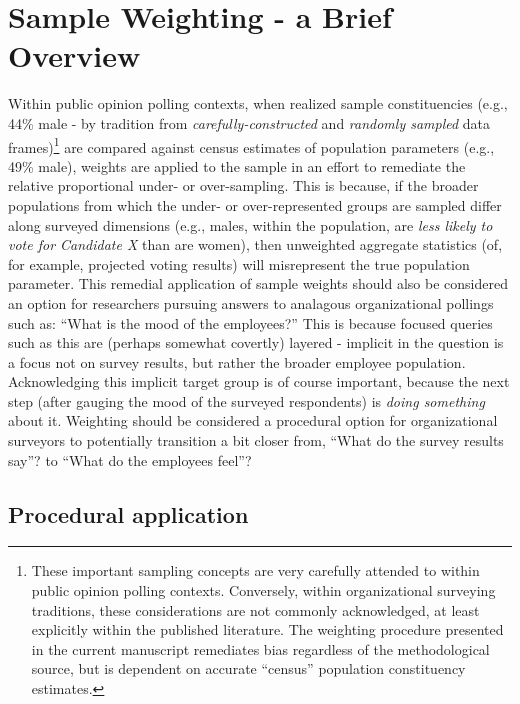 \documentclass[
  man,mask]{apa7}
\begin{document}
\hypertarget{sample-weighting---a-brief-overview}{%
\section{Sample Weighting - a Brief Overview}\label{sample-weighting---a-brief-overview}}

Within public opinion polling contexts, when realized sample constituencies (e.g., 44\% male - by tradition from \emph{carefully-constructed} and \emph{randomly sampled} data frames)\footnote{These important sampling concepts are very carefully attended to within public opinion polling contexts. Conversely, within organizational surveying traditions, these considerations are not commonly acknowledged, at least explicitly within the published literature. The weighting procedure presented in the current manuscript remediates bias regardless of the methodological source, but is dependent on accurate ``census'' population constituency estimates.} are compared against census estimates of population parameters (e.g., 49\% male), weights are applied to the sample in an effort to remediate the relative proportional under- or over-sampling. This is because, if the broader populations from which the under- or over-represented groups are sampled differ along surveyed dimensions (e.g., males, within the population, are \emph{less likely to vote for Candidate X} than are women), then unweighted aggregate statistics (of, for example, projected voting results) will misrepresent the true population parameter. This remedial application of sample weights should also be considered an option for researchers pursuing answers to analagous organizational pollings such as: ``What is the mood of the employees?'' This is because focused queries such as this are (perhaps somewhat covertly) layered - implicit in the question is a focus not on survey results, but rather the broader employee population. Acknowledging this implicit target group is of course important, because the next step (after gauging the mood of the surveyed respondents) is \emph{doing something} about it. Weighting should be considered a procedural option for organizational surveyors to potentially transition a bit closer from, ``What do the survey results say''? to ``What do the employees feel''?

\hypertarget{procedural-application}{%
\subsection{Procedural application}\label{procedural-application}}
\end{document}
